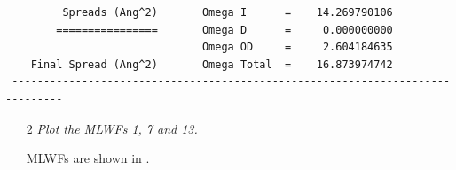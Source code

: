\begin{itemize}
\begin{tcolorbox}[floatplacement=h!,float,nobeforeafter,sharp corners,boxrule=0.5pt]
{\begin{verbatim}
         Spreads (Ang^2)       Omega I      =    14.269790106
        ================       Omega D      =     0.000000000
                               Omega OD     =     2.604184635
    Final Spread (Ang^2)       Omega Total  =    16.873974742
 ------------------------------------------------------------------------------
\end{verbatim}
}
\end{tcolorbox}
\end{itemize}


\begin{itemize}
\item[2] {\it Plot the MLWFs 1, 7 and 13.}

MLWFs are shown in .

\end{itemize}
